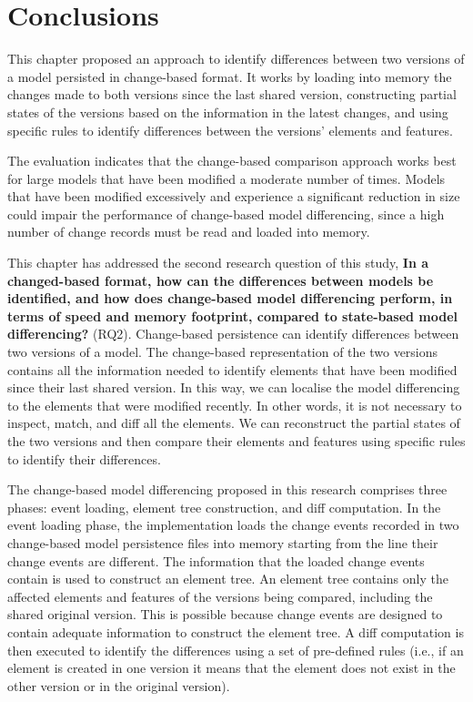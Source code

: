 \section{Conclusions}
\label{sec:conclusions_6}
This chapter proposed an approach to identify differences between two versions of a model persisted in change-based format. It works by loading into memory the changes made to both versions since the last shared version, constructing partial states of the versions based on the information in the latest changes, and using specific rules to identify differences between the versions’ elements and features.

The evaluation indicates that the change-based comparison approach works best for large models that have been modified a moderate number of times. Models that have been modified excessively and experience a significant reduction in size could impair the performance of change-based model differencing, since a high number of change records must be read and loaded into memory.

This chapter has addressed the second research question of this study, \textbf{In a changed-based format, how can the differences between models be identified, and how does change-based model differencing perform, in terms of speed and memory footprint, compared to state-based model differencing?} (RQ2). Change-based persistence can identify differences between two versions of a model. The change-based representation of the two versions contains all the information needed to identify elements that have been modified since their last shared version. In this way, we can localise the model differencing to the elements that were modified recently. In other words, it is not necessary to inspect, match, and diff all the elements. We can reconstruct the partial states of the two versions and then compare their elements and features using specific rules to identify their differences.

The change-based model differencing proposed in this research comprises three phases: event loading, element tree construction, and diff computation. In the event loading phase, the implementation loads the change events recorded in two change-based model persistence files into memory starting from the line their change events are different. The information that the loaded change events contain is used to construct an element tree. An element tree contains only the affected elements and features of the versions being compared, including the shared original version. This is possible because change events are designed to contain adequate information to construct the element tree. A diff computation is then executed to identify the differences using a set of pre-defined rules (i.e., if an element is created in one version it means that the element does not exist in the other version or in the original version).

